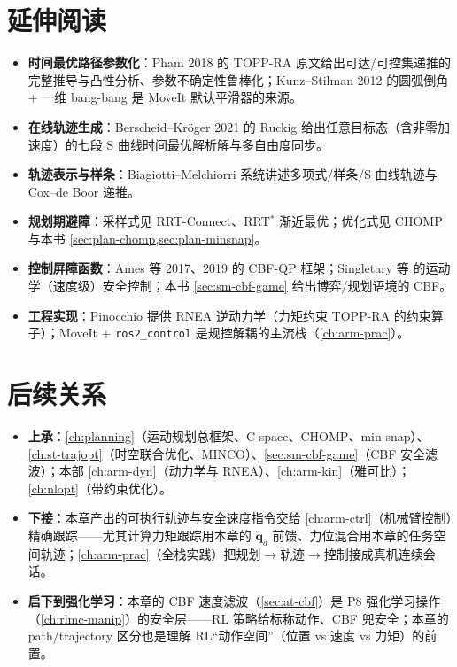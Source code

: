 \section*{延伸阅读}

\begin{itemize}
  \item \textbf{时间最优路径参数化}：Pham 2018\cite{pham2018toppra} 的 TOPP-RA 原文给出可达/可控集递推的完整推导与凸性分析、参数不确定性鲁棒化；Kunz--Stilman 2012\cite{kunz2012totg} 的圆弧倒角 + 一维 bang-bang 是 MoveIt 默认平滑器的来源。
  \item \textbf{在线轨迹生成}：Berscheid--Kröger 2021\cite{berscheid2021ruckig} 的 Ruckig 给出任意目标态（含非零加速度）的七段 S 曲线时间最优解析解与多自由度同步。
  \item \textbf{轨迹表示与样条}：Biagiotti--Melchiorri\cite{biagiotti2008trajectory} 系统讲述多项式/样条/S 曲线轨迹与 Cox--de Boor 递推。
  \item \textbf{规划期避障}：采样式见 RRT-Connect\cite{kuffner2000rrtconnect}、RRT$^*$ 渐近最优\cite{karaman2011sampling}；优化式见 CHOMP\cite{zucker2013chomp} 与本书 \cref{sec:plan-chomp,sec:plan-minsnap}。
  \item \textbf{控制屏障函数}：Ames 等 2017\cite{ames2017cbf}、2019\cite{ames2019cbf} 的 CBF-QP 框架；Singletary 等\cite{singletary2021safety} 的运动学（速度级）安全控制；本书 \cref{sec:sm-cbf-game} 给出博弈/规划语境的 CBF。
  \item \textbf{工程实现}：Pinocchio\cite{carpentier2019pinocchio} 提供 RNEA 逆动力学（力矩约束 TOPP-RA 的约束算子）；MoveIt + \texttt{ros2\_control} 是规控解耦的主流栈（\cref{ch:arm-prac}）。
\end{itemize}

\section*{后续关系}

\begin{itemize}
  \item \textbf{上承}：\cref{ch:planning}（运动规划总框架、C-space、CHOMP、min-snap）、\cref{ch:st-trajopt}（时空联合优化、MINCO）、\cref{sec:sm-cbf-game}（CBF 安全滤波）；本部 \cref{ch:arm-dyn}（动力学与 RNEA）、\cref{ch:arm-kin}（雅可比）；\cref{ch:nlopt}（带约束优化）。
  \item \textbf{下接}：本章产出的可执行轨迹与安全速度指令交给 \cref{ch:arm-ctrl}（机械臂控制）精确跟踪——尤其计算力矩跟踪用本章的 $\ddot{\mathbf{q}}_d$ 前馈、力位混合用本章的任务空间轨迹；\cref{ch:arm-prac}（全栈实践）把规划$\to$轨迹$\to$控制接成真机连续会话。
  \item \textbf{启下到强化学习}：本章的 CBF 速度滤波（\cref{sec:at-cbf}）是 P8 强化学习操作（\cref{ch:rlmc-manip}）的安全层——RL 策略给标称动作、CBF 兜安全；本章的 path/trajectory 区分也是理解 RL“动作空间”（位置 vs 速度 vs 力矩）的前置。
\end{itemize}

